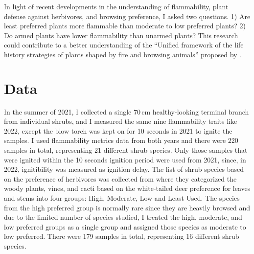 \documentclass{ttuthes2007}
\begin{document}
In light of recent developments in the understanding of flammability, plant defense against herbivores, and browsing preference, I asked two questions. 1) Are least preferred plants more flammable than moderate to low preferred plants?  2) Do armed plants have lower flammability than unarmed plants? This research could contribute to a better understanding of the ``Unified framework of the life history strategies of plants shaped by fire and browsing animals'' proposed by \citep{archibald2019unified}.


\section{Data}

In the summer of 2021, I collected a single 70\,cm healthy-looking terminal branch from individual shrubs, and I measured the same nine flammability traits like 2022, except the blow torch was kept on for 10 seconds in 2021 to ignite the samples.  I used flammability metrics data from both years and there were 220 samples in total, representing 21 different shrub species. Only those samples that were ignited within the 10 seconds ignition period were used from 2021, since, in 2022, ignitibility was measured as ignition delay. The list of shrub species based on the preference of herbivores was collected from \citep{wright2003white} where they categorized the woody plants, vines, and cacti based on the white-tailed deer preference for leaves and stems  into four groups: High, Moderate, Low and Least Used. The species from the high preferred group is normally rare since they are heavily browsed and due to the limited number of species studied, I treated the high, moderate, and low preferred groups as a single group and assigned those species as moderate to low preferred. There were 179 samples in total, representing 16 different shrub species.
\end{document}
